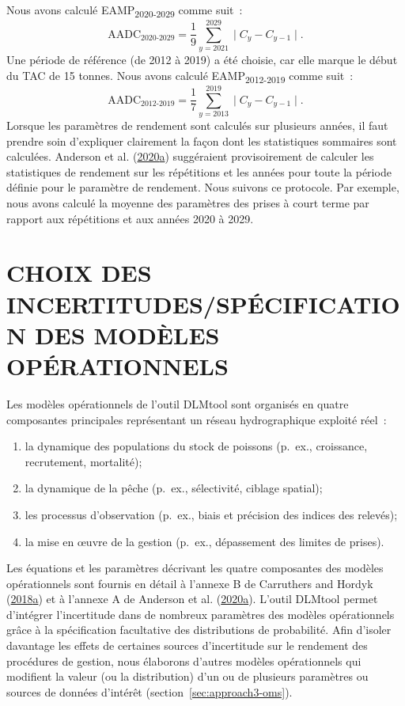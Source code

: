 \documentclass[11pt]{book}
\begin{document}
Nous avons calculé EAMP\textsubscript{2020-2029} comme suit~:
\begin{equation}
\textrm{AADC}_\textrm{2020-2029} = \dfrac{1}{9}\sum_{y=2021}^{2029} \mid C_y - C_{y-1} \mid.
\end{equation}
Une période de référence (de 2012 à 2019) a été choisie, car elle marque le début du TAC de 15 tonnes. Nous avons calculé EAMP\textsubscript{2012-2019} comme suit~:
\begin{equation}
\textrm{AADC}_\textrm{2012-2019} = \dfrac{1}{7}\sum_{y=2013}^{2019} \mid C_y - C_{y-1} \mid.
\end{equation}
Lorsque les paramètres de rendement sont calculés sur plusieurs années, il faut prendre soin d'expliquer clairement la façon dont les statistiques sommaires sont calculées. Anderson et al. (\protect\hyperlink{ref-anderson2020gfmp}{2020}\protect\hyperlink{ref-anderson2020gfmp}{a}) suggéraient provisoirement de calculer les statistiques de rendement sur les répétitions et les années pour toute la période définie pour le paramètre de rendement. Nous suivons ce protocole. Par exemple, nous avons calculé la moyenne des paramètres des prises à court terme par rapport aux répétitions et aux années 2020 à 2029.

\hypertarget{sec:om}{%
\section{CHOIX DES INCERTITUDES/SPÉCIFICATION DES MODÈLES OPÉRATIONNELS}\label{sec:om}}

Les modèles opérationnels de l'outil DLMtool sont organisés en quatre composantes principales représentant un réseau hydrographique exploité réel~:
\begin{enumerate}
\def\labelenumi{\arabic{enumi}.}

\item
  la dynamique des populations du stock de poissons (p.~ex., croissance, recrutement, mortalité);
\item
  la dynamique de la pêche (p.~ex., sélectivité, ciblage spatial);
\item
  les processus d'observation (p.~ex., biais et précision des indices des relevés);
\item
  la mise en œuvre de la gestion (p.~ex., dépassement des limites de prises).
\end{enumerate}
Les équations et les paramètres décrivant les quatre composantes des modèles opérationnels sont fournis en détail à l'annexe B de Carruthers and Hordyk (\protect\hyperlink{ref-carruthers2018}{2018}\protect\hyperlink{ref-carruthers2018}{a}) et à l'annexe A de Anderson et al. (\protect\hyperlink{ref-anderson2020gfmp}{2020}\protect\hyperlink{ref-anderson2020gfmp}{a}). L'outil DLMtool permet d'intégrer l'incertitude dans de nombreux paramètres des modèles opérationnels grâce à la spécification facultative des distributions de probabilité. Afin d'isoler davantage les effets de certaines sources d'incertitude sur le rendement des procédures de gestion, nous élaborons d'autres modèles opérationnels qui modifient la valeur (ou la distribution) d'un ou de plusieurs paramètres ou sources de données d'intérêt (section~\ref{sec:approach3-oms}).
\end{document}
